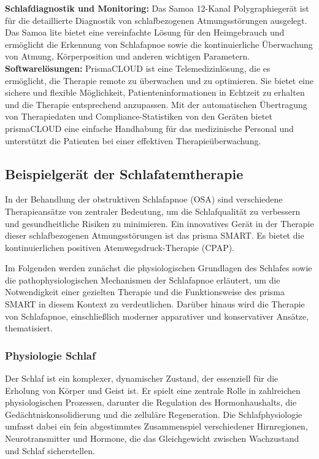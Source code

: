 \documentclass[a4paper, 12pt]{article}
\begin{document}
\textbf{Schlafdiagnostik und Monitoring:} Das Samoa 12-Kanal Polygraphiegerät ist für die detaillierte Diagnostik von schlafbezogenen Atmungsstörungen ausgelegt. Das Samoa lite bietet eine vereinfachte Lösung für den Heimgebrauch und ermöglicht die Erkennung von Schlafapnoe sowie die kontinuierliche Überwachung von Atmung, Körperposition und anderen wichtigen Parametern. \\

\textbf{Softwarelösungen:} PrismaCLOUD ist eine Telemedizinlösung, die es ermöglicht, die Therapie remote zu überwachen und zu optimieren. Sie bietet eine sichere und flexible Möglichkeit, Patienteninformationen in Echtzeit zu erhalten und die Therapie entsprechend anzupassen. Mit der automatischen Übertragung von Therapiedaten und Compliance-Statistiken von den Geräten bietet prismaCLOUD eine einfache Handhabung für das medizinische Personal und unterstützt die Patienten bei einer effektiven Therapieüberwachung.


\newpage
\subsection{Beispielgerät der Schlafatemtherapie}\label{prismaSmart}
In der Behandlung der obstruktiven Schlafapnoe (OSA) sind verschiedene Therapieansätze von zentraler Bedeutung, um die Schlafqualität zu verbessern und gesundheitliche Risiken zu minimieren. Ein innovatives Gerät in der Therapie dieser schlafbezogenen Atmungsstörungen ist das prisma SMART. Es bietet die kontinuierlichen positiven Atemwegsdruck-Therapie (CPAP). 

Im Folgenden werden zunächst die physiologischen Grundlagen des Schlafes sowie die pathophysiologischen Mechanismen der Schlafapnoe erläutert, um die Notwendigkeit einer gezielten Therapie und die Funktionsweise des prisma SMART in diesem Kontext zu verdeutlichen. Darüber hinaus wird die Therapie von Schlafapnoe, einschließlich moderner apparativer und konservativer Ansätze, thematisiert.

\subsubsection{Physiologie Schlaf}
Der Schlaf ist ein komplexer, dynamischer Zustand, der essenziell für die Erholung von Körper und Geist ist. Er spielt eine zentrale Rolle in zahlreichen physiologischen Prozessen, darunter die Regulation des Hormonhaushalts, die Gedächtniskonsolidierung und die zelluläre Regeneration. Die Schlafphysiologie umfasst dabei ein fein abgestimmtes Zusammenspiel verschiedener Hirnregionen, Neurotransmitter und Hormone, die das Gleichgewicht zwischen Wachzustand und Schlaf sicherstellen.
\end{document}
